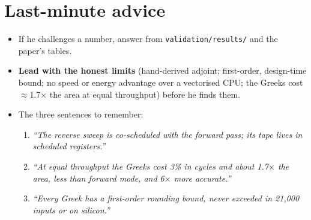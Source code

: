 \documentclass[11pt,a4paper]{article}
\begin{document}
\section{Last-minute advice}
\begin{itemize}
\item If he challenges a number, answer from \texttt{validation/results/} and the paper's tables.
\item \textbf{Lead with the honest limits} (hand-derived adjoint; first-order, design-time bound; no speed or energy advantage over a vectorised CPU; the Greeks cost $\approx$1.7$\times$ the area at equal throughput) before he finds them.
\item The three sentences to remember:
\begin{enumerate}
\item \emph{``The reverse sweep is co-scheduled with the forward pass; its tape lives in scheduled registers.''}
\item \emph{``At equal throughput the Greeks cost 3\% in cycles and about 1.7$\times$ the area, less than forward mode, and 6$\times$ more accurate.''}
\item \emph{``Every Greek has a first-order rounding bound, never exceeded in 21,000 inputs or on silicon.''}
\end{enumerate}
\end{itemize}
\end{document}
